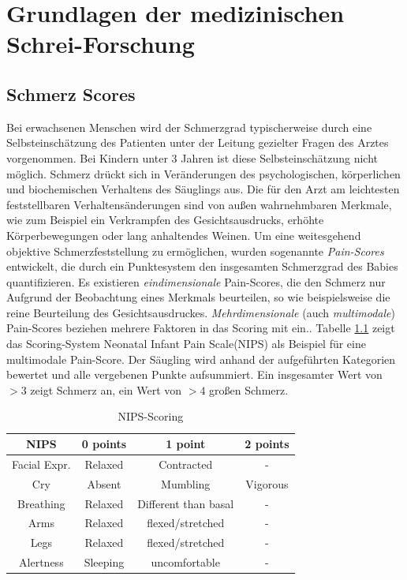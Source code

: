 \chapter{Grundlagen der medizinischen Schrei-Forschung}

\section{Schmerz Scores}
Bei erwachsenen Menschen wird der Schmerzgrad typischerweise durch eine Selbsteinschätzung des Patienten unter der Leitung gezielter Fragen des Arztes vorgenommen. Bei Kindern unter 3 Jahren ist diese Selbsteinschätzung nicht möglich. Schmerz drückt sich in Veränderungen des psychologischen, körperlichen und biochemischen Verhaltens des Säuglings aus. Die für den Arzt am leichtesten feststellbaren Verhaltensänderungen sind von außen wahrnehmbaren Merkmale, wie zum Beispiel ein Verkrampfen des Gesichtsausdrucks, erhöhte Körperbewegungen oder lang anhaltendes Weinen. Um eine weitesgehend objektive Schmerzfeststellung zu ermöglichen, wurden sogenannte \emph{Pain-Scores} entwickelt, die durch ein Punktesystem den insgesamten Schmerzgrad des Babies quantifizieren.\cite{PainAssessment01} Es existieren \emph{eindimensionale} Pain-Scores, die den Schmerz nur Aufgrund der Beobachtung eines Merkmals beurteilen, so wie beispielsweise die reine Beurteilung des Gesichtsausdruckes. \emph{Mehrdimensionale} (auch \emph{ multimodale}) Pain-Scores beziehen mehrere Faktoren in das Scoring mit ein.\cite{PainAssessment02}. Tabelle \ref{tab:nips} zeigt das Scoring-System \glqq Neonatal Infant Pain Scale\grqq{}(NIPS) als Beispiel für eine multimodale Pain-Score. Der Säugling wird anhand der aufgeführten Kategorien bewertet und alle vergebenen Punkte aufsummiert. Ein insgesamter Wert von $>3$ zeigt Schmerz an, ein Wert von $>4$ großen Schmerz.\cite{nips}

\begin{table}[h]
	\footnotesize
	\centering
	\caption{NIPS-Scoring}
	\label{tab:nips}
	\begin{tabular}{@{}cccc@{}}
		\toprule
		\textbf{NIPS}     & \textbf{0 points} & \textbf{1 point}     & \textbf{2 points} \\ \midrule
		Facial Expr. & Relaxed           & Contracted           & -                 \\
		Cry               & Absent            & Mumbling             & Vigorous          \\
		Breathing         & Relaxed           & Different than basal & -                 \\
		Arms              & Relaxed           & flexed/stretched     & -                 \\
		Legs              & Relaxed           & flexed/stretched     & -                 \\
		Alertness         & Sleeping          & uncomfortable        & -                 \\ \bottomrule
	\end{tabular}
\end{table}


